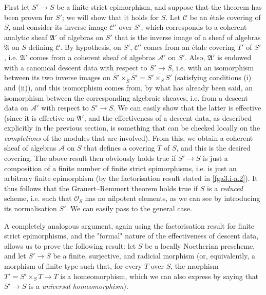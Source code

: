  First let \(S'\to  S\) be a finite strict epimorphism, and suppose that the theorem has been proven for \(S'\); we will show that it holds for \(S\).
  Let \(\mathscr {C}\) be an étale covering of \(\overline {S}\), and consider its inverse image \(\mathscr {C}'\) over \(S'\), which corresponds to a coherent analytic sheaf \(\mathfrak {A}'\) of algebras on \(S'\) that is the inverse image of a sheaf of algebras \(\mathfrak {A}\) on \(\overline {S}\) defining \(\mathscr {C}\).
  By hypothesis, on \(S'\), \(\mathscr {C}'\) comes from an étale covering \(T'\) of \(S'\), i.e. \(\mathfrak {A}'\) comes from a coherent sheaf of algebras \(\mathscr {A}'\) on \(S'\).
  Also, \(\mathfrak {A}'\) is endowed with a canonical descent data with respect to \(\overline {S}'\to \overline {S}\), i.e. with an isomorphism between its two inverse images on \(\overline {S}'\times _{\overline {S}}\overline {S}'=\overline {S'\times _SS'}\) (satisfying conditions (i) and (ii)), and this isomorphism comes from, by what has already been said, an isomorphism between the corresponding algebraic sheaves, i.e. from a descent data on \(\mathscr {A}'\) with respect to \(S'\to  S\).
  We can easily show that the latter is effective (since it is effective on \(\mathfrak {A}'\), and the effectiveness of a descent data, as described explicitly in the previous section, is something that can be checked locally on the \emph{completions} of the modules that are involved).
  From this, we obtain a coherent sheaf of algebras \(\mathscr {A}\) on \(S\) that defines a covering \(T\) of \(S\), and this is the desired covering.
  The above result then obviously holds true if \(S'\to  S\) is just a composition of a finite number of finite strict epimorphisms, i.e. is just an arbitrary finite epimorphism (by the factorisation result stated in \cref{fga3.i-a.2}).
  It thus follows that the Grauert–Remmert theorem holds true if \(S\) is a \emph{reduced} scheme, i.e. such that \(\mathscr {O}_S\) has no nilpotent elements, as we can see by introducing its normalisation \(S'\).
  We can easily pass to the general case.\par{}A completely analogous argument, again using the factorisation result for finite strict epimorphisms, and the "formal" nature of the effectiveness of descent data, allows us to prove the following result:
  let \(S\) be a locally Noetherian prescheme, and let \(S'\to  S\) be a finite, surjective, and radicial morphism (or, equivalently, a morphism of finite type such that, for every \(T\) over \(S\), the morphism \(T'=S'\times _S T\to  T\) is a homeomorphism, which we can also express by saying that \(S'\to  S\) is a \emph{universal homeomorphism}).
